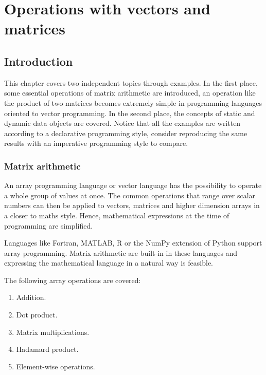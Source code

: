 \chapter{Operations with vectors and matrices}    \label{chap:matrices}


\vspace{-.7cm}
\section{Introduction}

This chapter covers two independent topics through examples. 
In the first place, some essential operations of matrix arithmetic are introduced, 
an operation like the product of two matrices becomes extremely simple 
in programming languages oriented to vector programming. 
In the second place, the concepts of static and dynamic data objects are covered. 
Notice that all the examples are written according to a declarative programming style, 
consider reproducing the same results with an imperative programming style to compare.
    
    \vspace{-.3cm}
    \subsection*{Matrix arithmetic}
    \vspace{-.2cm}

An array programming language or vector language has the possibility 
to operate a whole group of values at once.
The common operations that range over scalar numbers can then be applied to vectors, 
matrices and higher dimension arrays in a closer to maths style. 
Hence, mathematical expressions at the time of programming are simplified.

Languages like Fortran, MATLAB, R or the NumPy extension of Python support array programming.
Matrix arithmetic are built-in in these languages and expressing the mathematical language in a natural way is feasible.

\newpage
The following array operations are covered:
\begin{enumerate}
    \item Addition. 
    \item Dot product.
    \item Matrix multiplications. 
    \item Hadamard product. 
    \item Element-wise operations.
\end{enumerate}  


